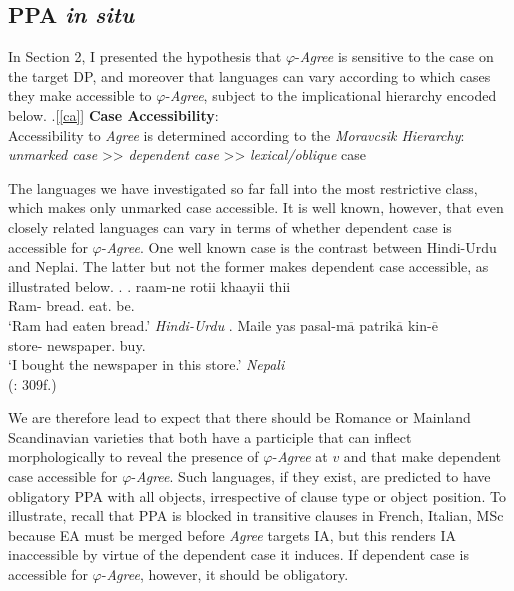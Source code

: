 \documentclass[11pt, letterpaper]{paper_nick}
\begin{document}
\subsection{PPA \emph{in situ}}
In Section 2, I presented the hypothesis that $\varphi$-\emph{Agree} is sensitive to the case on the target DP, and moreover that languages can vary according to which cases they make accessible to $\varphi$-\emph{Agree}, subject to the implicational hierarchy encoded below. 
\ex.[\ref{ca}] \textbf{Case Accessibility}:\\
Accessibility to \emph{Agree} is determined according to the \emph{Moravcsik Hierarchy}:\\
\emph{unmarked case} >> \emph{dependent case} >> \emph{lexical/oblique} case

The languages we have investigated so far fall into the most restrictive class, which makes only unmarked case accessible. It is well known, however, that even closely related languages can vary in terms of whether dependent case is accessible for $\varphi$-\emph{Agree}. One well known case is the contrast between Hindi-Urdu and Neplai. The latter but not the former makes dependent case accessible, as illustrated below. 
\ex. \ag. raam-ne rotii khaayii thii\\
Ram- bread. eat. be.\\
`Ram had eaten bread.' \hfill \emph{Hindi-Urdu}
\bg. Maile yas pasal-m$\overline{\text{a}}$ patrik$\overline{\text{a}}$ kin-$\overline{\text{e}}$\\
  store- newspaper. buy.\\
`I bought the newspaper in this store.' \hfill \emph{Nepali}\\
(\citealt{bobaljik08}: 309f.)


We are therefore lead to expect that there should be Romance or Mainland Scandinavian varieties that both have a participle that can inflect morphologically to reveal the presence of $\varphi$-\emph{Agree} at $v$ and that make dependent case accessible for $\varphi$-\emph{Agree}. Such languages, if they exist, are predicted to have obligatory PPA with all objects, irrespective of clause type or object position. To illustrate, recall that PPA is blocked in transitive clauses in French, Italian, MSc because EA must be merged before \emph{Agree} targets IA, but this renders IA inaccessible by virtue of the dependent case it induces. If dependent case is accessible for $\varphi$-\emph{Agree}, however, it should be obligatory.
\end{document}
